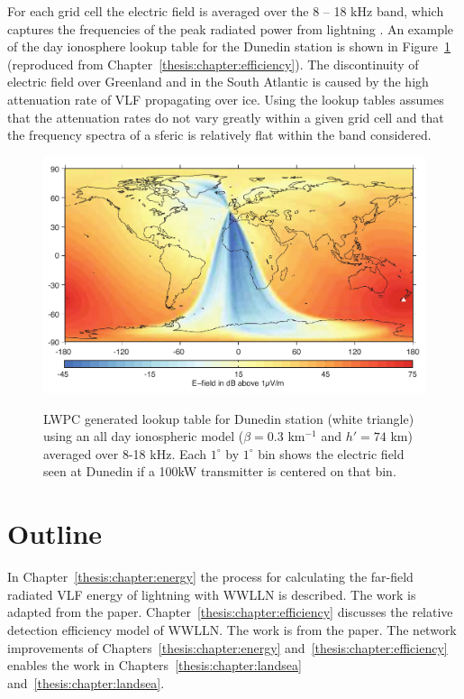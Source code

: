 For each grid cell the electric field is averaged over the 8 -- 18 kHz band, which captures the frequencies of the peak radiated power from lightning \citep{Volland1995}.
An example of the day ionosphere lookup table for the Dunedin station is shown in Figure~\ref{intro:fig:lookup} (reproduced from Chapter~\ref{thesis:chapter:efficiency}).
The discontinuity of electric field over Greenland and in the South Atlantic is caused by the high attenuation rate of VLF propagating over ice.
Using the lookup tables assumes that the attenuation rates do not vary greatly within a given grid cell and that the frequency spectra of a sferic is relatively flat within the band considered.

\begin{figure}[ht!]
	\centering
	\includegraphics[scale=1]{Introduction/Figures/lwpc_Lookup.pdf}\\
	\caption{LWPC generated lookup table for Dunedin station (white triangle) using an all day ionospheric model ($	\beta=0.3$ km$^{-1}$ and $h'=74$ km) averaged over 8-18 kHz. Each $1^{\circ}$ by $1^{\circ}$ bin shows the electric field seen at Dunedin if a 100kW transmitter is centered on that bin.}
	\label{intro:fig:lookup}
\end{figure}

\section{Outline}

In Chapter~\ref{thesis:chapter:energy} the process for calculating the far-field radiated VLF energy of lightning with WWLLN is described.
The work is adapted from the \citet{Hutchins2012} paper.
Chapter~\ref{thesis:chapter:efficiency} discusses the relative detection efficiency model of WWLLN.
The work is from the \citet{Hutchins2012a} paper.
The network improvements of Chapters~\ref{thesis:chapter:energy} and~\ref{thesis:chapter:efficiency} enables the work in Chapters~\ref{thesis:chapter:landsea} and~\ref{thesis:chapter:landsea}.


